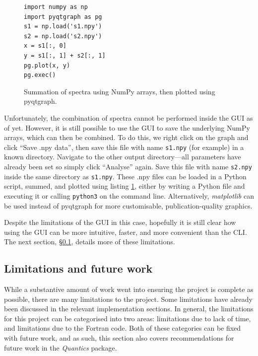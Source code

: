 \documentclass[12pt]{article}
\newenvironment{code}{\captionsetup{type=listing}}{\par\addvspace{\baselineskip}}
\begin{document}
\begin{figure}
\begin{code}\begin{verbatim}
import numpy as np
import pyqtgraph as pg
s1 = np.load('s1.npy')
s2 = np.load('s2.npy')
x = s1[:, 0]
y = s1[:, 1] + s2[:, 1]
pg.plot(x, y)
pg.exec()
\end{verbatim}
\caption{Summation of spectra using NumPy arrays, then plotted using pyqtgraph.}
\label{lst:sumspec}
\end{code}
\end{figure}

Unfortunately, the combination of spectra cannot be performed inside the GUI as of yet. However, it is still possible to use the GUI to save the underlying NumPy arrays, which can then be combined. To do this, we right click on the graph and click ``Save .npy data'', then save this file with name \texttt{s1.npy} (for example) in a known directory. Navigate to the other output directory---all parameters have already been set so simply click ``Analyse'' again. Save this file with name \texttt{s2.npy} inside the same directory as \texttt{s1.npy}. These .npy files can be loaded in a Python script, summed, and plotted using listing \ref{lst:sumspec}, either by writing a Python file and executing it or calling \texttt{python3} on the command line. Alternatively, \textit{matplotlib} can be used instead of pyqtgraph for more customisable, publication-quality graphics.

Despite the limitations of the GUI in this case, hopefully it is still clear how using the GUI can be more intuitive, faster, and more convenient than the CLI. The next section, \S\ref{ssec:limitations}, details more of these limitations.

\subsection{Limitations and future work}\label{ssec:limitations}

While a substantive amount of work went into ensuring the project is complete as possible, there are many limitations to the project. Some limitations have already been discussed in the relevant implementation sections. In general, the limitations for this project can be categorised into two areas: limitations due to lack of time, and limitations due to the Fortran code. Both of these categories can be fixed with future work, and as such, this section also covers recommendations for future work in the \textit{Quantics} package.
\end{document}

